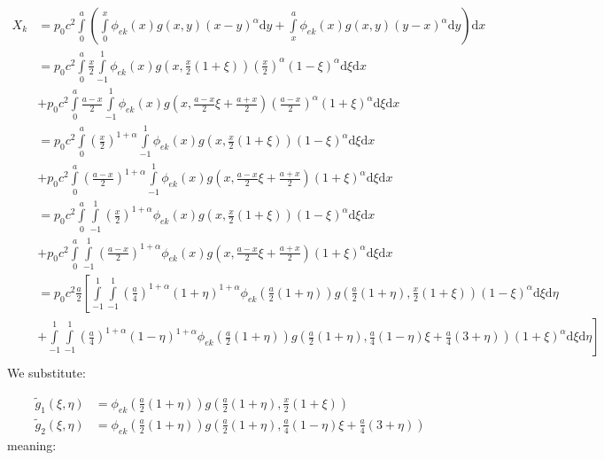\documentclass[12pt,letterpaper]{article}
\theoremstyle{definition}
\numberwithin{equation}{subsection}
\newcommand{\dd}{\text{d}}
\begin{document}
\begin{align*}
    X_{k} &= p_0 c^2 \int\limits_0^a \left( \int\limits_0^x \phi_{ek}(x) g(x,y) (x-y)^{\alpha}\dd y + \int\limits_x^a \phi_{ek}(x) g(x,y) (y-x)^{\alpha}\dd y\right) \dd x \\
    &= p_0 c^2 \int\limits_0^a \frac{x}{2} \int\limits_{-1}^{1}\phi_{ek}(x) g\left(x, \frac{x}{2}(1+ \xi) \right)\left(\frac{x}{2}\right)^{\alpha} (1-\xi)^{\alpha} \dd \xi \dd x \\
    &+ p_0 c^2 \int\limits_0^a \frac{a - x}{2} \int\limits_{-1}^{1}\phi_{ek}(x) g\left(x, \frac{a-x}{2}\xi + \frac{a+x}{2}\right)\left(\frac{a-x}{2}\right)^{\alpha} (1+\xi)^{\alpha} \dd \xi \dd x \\
    &= p_0 c^2 \int\limits_0^a \left(\frac{x}{2}\right)^{1+ \alpha} \int\limits_{-1}^{1}\phi_{ek}(x) g\left(x, \frac{x}{2}(1+ \xi) \right) (1-\xi)^{\alpha} \dd \xi \dd x \\
    &+ p_0 c^2 \int\limits_0^a \left(\frac{a-x}{2}\right)^{1+\alpha} \int\limits_{-1}^{1}\phi_{ek}(x) g\left(x, \frac{a-x}{2}\xi + \frac{a+x}{2}\right) (1+\xi)^{\alpha} \dd \xi \dd x \\
    &= p_0 c^2 \int\limits_0^a \int\limits_{-1}^{1}\left(\frac{x}{2}\right)^{1+ \alpha} \phi_{ek}(x) g\left(x, \frac{x}{2}(1+ \xi) \right) (1-\xi)^{\alpha} \dd \xi \dd x \\
    &+ p_0 c^2 \int\limits_0^a \int\limits_{-1}^{1}\left(\frac{a-x}{2}\right)^{1+\alpha} \phi_{ek}(x) g\left(x, \frac{a-x}{2}\xi + \frac{a+x}{2}\right) (1+\xi)^{\alpha} \dd \xi \dd x \\
    &= p_0 c^2 \frac{a}{2} \left[ \int\limits_{-1}^1 \int\limits_{-1}^{1} \left(\frac{a}{4}\right)^{1+ \alpha} (1+\eta)^{1+\alpha} \phi_{ek}\left(\frac{a}{2}(1+\eta)\right) g\left(\frac{a}{2}(1+\eta), \frac{x}{2}(1+ \xi) \right) (1-\xi)^{\alpha} \dd \xi \dd \eta \right.\\
    &+ \left. \int\limits_{-1}^1 \int\limits_{-1}^{1} \left(\frac{a}{4}\right)^{1+ \alpha} (1-\eta)^{1+\alpha} \phi_{ek}\left(\frac{a}{2}(1+\eta)\right) g\left(\frac{a}{2}(1+\eta), \frac{a}{4}(1-\eta)\xi + \frac{a}{4}(3+\eta)\right) (1+\xi)^{\alpha} \dd \xi \dd \eta \right]\\
\end{align*}
We substitute:

\begin{align}
    \tilde g_1 (\xi, \eta) &= \phi_{ek}\left(\frac{a}{2}(1+\eta)\right) g\left(\frac{a}{2}(1+\eta), \frac{x}{2}(1+ \xi) \right) \\
    \tilde g_2 (\xi, \eta) &= \phi_{ek}\left(\frac{a}{2}(1+\eta)\right) g\left(\frac{a}{2}(1+\eta), \frac{a}{4}(1-\eta)\xi + \frac{a}{4}(3+\eta)\right)
\end{align}
meaning:
\end{document}
